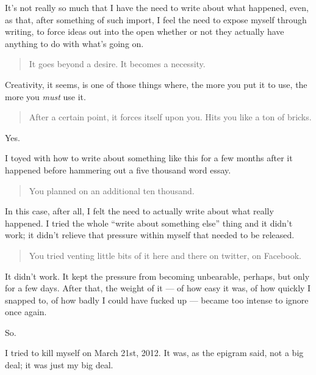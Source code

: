 It's not really so much that I have the need to write about what happened, even, as that, after something of such import, I feel the need to expose myself through writing, to force ideas out into the open whether or not they actually have anything to do with what's going on.

\begin{quote}
It goes beyond a desire. It becomes a necessity.
\end{quote}

Creativity, it seems, is one of those things where, the more you put it to use, the more you \emph{must} use it.

\begin{quote}
After a certain point, it forces itself upon you. Hits you like a ton of bricks.
\end{quote}

Yes.

I toyed with how to write about something like this for a few months after it happened before hammering out a five thousand word essay.

\begin{quote}
You planned on an additional ten thousand.
\end{quote}

In this case, after all, I felt the need to actually write about what really happened. I tried the whole ``write about something else'' thing and it didn't work; it didn't relieve that pressure within myself that needed to be released.

\begin{quote}
You tried venting little bits of it here and there on twitter, on Facebook.
\end{quote}

It didn't work. It kept the pressure from becoming unbearable, perhaps, but only for a few days. After that, the weight of it --- of how easy it was, of how quickly I snapped to, of how badly I could have fucked up --- became too intense to ignore once again.

So.

I tried to kill myself on March 21st, 2012. It was, as the epigram said, not a big deal; it was just my big deal.
